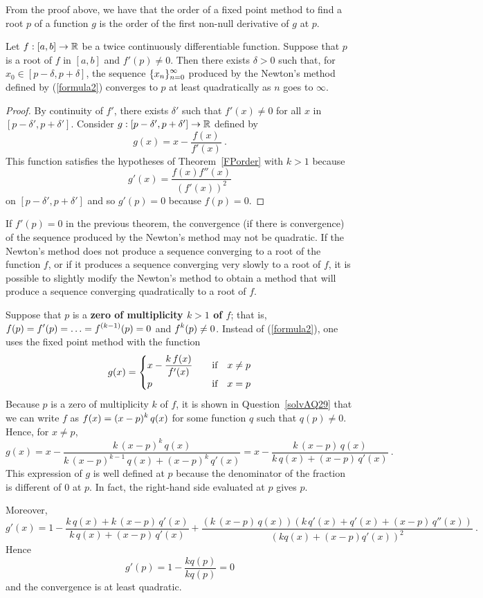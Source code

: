 From the proof above, we have that the order of a fixed point method
to find a root $p$ of a function $g$ is the order of the first
non-null derivative of $g$ at $p$.

\begin{theorem}
Let $f:[a,b] \rightarrow \mathbb{R}$ be a twice continuously differentiable
function.  Suppose that $p$ is a root of $f$ in $[a,b]$ and
$f'(p) \neq 0$.  Then there exists $\delta > 0$ such that, for
$x_0 \in [p-\delta, p + \delta]$, the sequence
$\displaystyle \{x_n\}_{n=0}^\infty$ produced by the
Newton's method defined by (\ref{formula2}) converges to $p$ at least
quadratically as $n$ goes to $\infty$.
\label{newton_order}
\end{theorem}

\begin{proof}
By continuity of $f'$, there exists $\delta'$ such that $f'(x) \neq 0$
for all $x$ in $[p-\delta',p+\delta']$.  Consider
$g:[p-\delta',p+\delta'] \rightarrow \mathbb{R}$ defined by
\[
g(x) = x - \frac{f(x)}{f'(x)} \ .
\]
This function satisfies the hypotheses of Theorem~\ref{FPorder} with
$k > 1$ because
\[
g'(x) = \frac{f(x)f''(x)}{(f'(x))^2}
\]
on $[p-\delta',p+\delta']$ and so $g'(p) = 0$ because $f(p) = 0$.
\end{proof}

\begin{rmk}
If $f'(p) = 0$ in the previous theorem, the convergence (if there is
convergence) of the sequence produced by the Newton's method may
not be quadratic.  If the Newton's method does not produce a
sequence converging to a root of the function $f$, or if it
produces a sequence converging very slowly to a root of $f$, it is
possible to slightly modify the Newton's method to obtain a method
that will produce a sequence converging quadratically to a root of
$f$.

Suppose that $p$ is a {\bfseries zero of multiplicity $k> 1$ of
$f$};
that is, $\displaystyle f(p) = f'(p) = \ldots = f^{(k-1)}(p) = 0$
and $\displaystyle f^k(p) \neq 0$. 
Instead of (\ref{formula2}), one uses the fixed point method
with the function
\[
g(x) = \begin{cases}
\displaystyle x - \frac{k\,f(x)}{f'(x)} & \quad \text{if} \quad x \neq p \\
  p & \quad \text{if} \quad x = p
\end{cases}
\]
Because $p$ is a zero of multiplicity $k$ of $f$, it is shown in
Question~\ref{solvAQ29} that we can write $f$ as
$\displaystyle f(x) = (x-p)^k\,q(x)$ for some function $q$ such that
$q(p) \neq 0$. Hence, for $x \neq p$,
\[
g(x) = x - \frac{k\,(x-p)^k\,q(x)}
{k\,(x-p)^{k-1}\,q(x)+(x-p)^k\,q'(x)}
= x - \frac{k\,(x-p)\,q(x)}{k\,q(x) + (x-p)\,q'(x)} \ .
\]
This expression of $g$ is well defined at $p$ because the denominator
of the fraction is different of $0$ at $p$.  In fact, the right-hand
side evaluated at $p$ gives $p$.

Moreover,
\[
g'(x) = 1 -
\frac{k\,q(x) + k\,(x-p)\,q'(x)}{k\,q(x) + (x-p)\,q'(x)}
+ \frac{\left(k\,(x-p)\,q(x)\right)
\left(k\,q'(x) + q'(x) + (x-p)\,q''(x)\right)}
{\left(kq(x) + (x-p)q'(x) \right)^2} \ .
\]
Hence
\[
g'(p) = 1 - \frac{kq(p)}{kq(p)} = 0
\]
and the convergence is at least quadratic.
\label{multiplicity}
\end{rmk}

